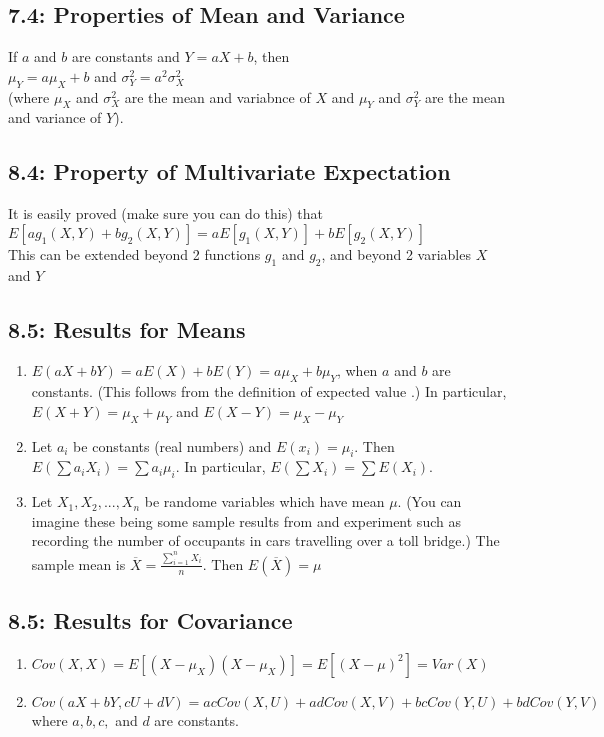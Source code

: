 \documentclass[11pt]{article}
\begin{document}
	
	\subsection*{7.4: Properties of Mean and Variance}
		If $a$ and $b$ are constants and $Y = aX+b$, then\\
		$\mu_Y=a\mu_X + b$ and $\sigma^2_Y=a^2 \sigma^2_X$\\
		(where $\mu_X$ and $\sigma^2_X$ are the mean and variabnce of $X$ and $\mu_Y$ and $\sigma^2_Y $ are the mean and variance of $Y$).

     \subsection*{8.4: Property of Multivariate Expectation}
     	It is easily proved (make sure you can do this) that\\
     	$E[ag_1(X,Y)+bg_2(X,Y)]=aE[g_1(X,Y)]+bE[g_2(X,Y)]$\\
     	This can be extended beyond 2 functions $g_1$ and $g_2$, and beyond 2 variables $X$ and $Y$
     	
     \subsection*{8.5: Results for Means}
     	\begin{enumerate}
     		\item $E(aX+bY)=aE(X)+bE(Y) = a\mu_X+b\mu_Y$, when $a$ and $b$ are constants. (This follows from the definition of expected value .) In particular, $E(X+Y) = \mu_X +\mu_Y$ and $E(X-Y)=\mu_X-\mu_Y$
     		\item Let $a_i$ be constants (real numbers) and $E(x_i) = \mu_i$. Then $E(\sum a_iX_i)=\sum a_i\mu_i$. In particular, $E(\sum X_i)=\sum E(X_i)$.
     		\item Let $X_1,X_2,...,X_n$ be randome variables which have mean $\mu$. (You can imagine these being some sample results from and experiment such as recording the number of occupants in cars travelling over a toll bridge.) The sample mean is $\overline{X}=\frac{\sum^n_{i=1}X_i}{n}$. Then $E(\overline{X}) = \mu$
     	\end{enumerate}
     
     
     \subsection*{8.5: Results for Covariance}
     	\begin{enumerate}
     		\item $Cov(X,X) = E[(X-\mu_X)(X-\mu_X)]=E[(X-\mu)^2]=Var(X)$
     		\item $Cov(aX+bY,cU+dV)=acCov(X,U)+adCov(X,V)+bcCov(Y,U)+bdCov(Y,V)$ where $a,b,c,$ and $d$ are constants.
     	\end{enumerate}
     
\end{document}
